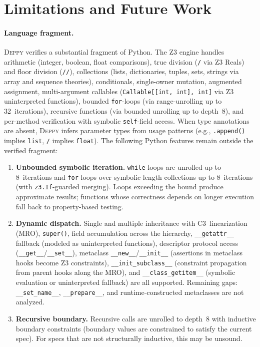 \documentclass[acmsmall,nonacm,screen]{acmart}
\newcommand{\deppy}{\textsc{Deppy}}
\begin{document}

\section{Limitations and Future Work}\label{sec:limits}

\paragraph{Language fragment.}
\deppy{} verifies a substantial fragment of Python.
The Z3 engine handles arithmetic (integer, boolean, float comparisons),
true division (\texttt{/} via Z3 Reals) and floor division (\texttt{//}),
collections (lists, dictionaries, tuples, sets, strings via array and
sequence theories), conditionals, single-owner mutation, augmented
assignment, multi-argument callables
(\texttt{Callable[[int, int], int]} via Z3 uninterpreted functions),
bounded \texttt{for}-loops (via range-unrolling up to 32~iterations),
recursive functions (via bounded unrolling up to depth~8), and
per-method verification with symbolic \texttt{self}-field access.
When type annotations are absent, \deppy{} infers parameter types from
usage patterns (e.g., \texttt{.append()} implies \texttt{list},
\texttt{/} implies \texttt{float}).
The following Python features remain outside the verified fragment:
\begin{enumerate}
\item \textbf{Unbounded symbolic iteration.}  \texttt{while} loops are
  unrolled up to 8~iterations and \texttt{for} loops over
  symbolic-length collections up to 8~iterations (with
  \texttt{z3.If}-guarded merging).  Loops exceeding the bound produce
  approximate results; functions whose correctness depends on longer
  execution fall back to property-based testing.
\item \textbf{Dynamic dispatch.}  Single and multiple inheritance with
  C3~linearization (MRO), \texttt{super()},
  field accumulation across the hierarchy, \texttt{\_\_getattr\_\_}
  fallback (modeled as uninterpreted functions), descriptor
  protocol access (\texttt{\_\_get\_\_}/\texttt{\_\_set\_\_}),
  metaclass \texttt{\_\_new\_\_}/\texttt{\_\_init\_\_} (assertions in
  metaclass hooks become Z3 constraints),
  \texttt{\_\_init\_subclass\_\_} (constraint propagation from parent
  hooks along the MRO), and \texttt{\_\_class\_getitem\_\_} (symbolic
  evaluation or uninterpreted fallback) are all supported.
  Remaining gaps: \texttt{\_\_set\_name\_\_}, \texttt{\_\_prepare\_\_},
  and runtime-constructed metaclasses are not analyzed.
\item \textbf{Recursive boundary.}  Recursive calls are unrolled to
  depth~8 with inductive boundary constraints (boundary values are
  constrained to satisfy the current spec).  For specs that are not
  structurally inductive, this may be unsound.
\end{enumerate}
\end{document}
